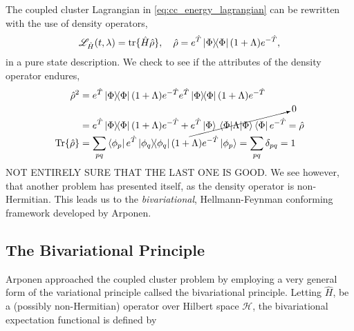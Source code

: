 The coupled cluster Lagrangian in \autoref{eq:cc_energy_lagrangian} can be rewritten 
with the use of density operators,
\begin{equation}
    \mathscr{L}_{\hat{H}}(t, \lambda) = \tr\{\hat{H}\hat{\rho}\}, \quad
    \hat{\rho} = e^{\hat{T}}\outerproduct{\Phi}(1 + \Lambda)e^{-\hat{T}},
\end{equation}
in a pure state description. We check to see if the attributes of the density operator 
endures,
\begin{align*}
    \hat{\rho}^2 &= 
        e^{\hat{T}}\outerproduct{\Phi}(1 + \Lambda)e^{-\hat{T}}
        e^{\hat{T}}\outerproduct{\Phi}(1 + \Lambda)e^{-\hat{T}} \\
        &= 
        e^{\hat{T}}\outerproduct{\Phi}(1 + \Lambda)e^{-\hat{T}}
        + \cancelto{0}{e^{\hat{T}}\ket{\Phi}
        \mel{\Phi}{\Lambda}{\Phi}
        \bra{\Phi}e^{-\hat{T}}} 
        = \hat{\rho} \\
    \Tr{\hat{\rho}} &= \sum_{pq} \bra{\phi_p}e^{\hat{T}}\outerproduct{\phi_q}(1 + \Lambda)e^{-\hat{T}} \ket{\phi_p}
    = \sum_{pq} \delta_{pq} = 1
\end{align*}
NOT ENTIRELY SURE THAT THE LAST ONE IS GOOD. We see however, that another problem has 
presented itself, as the density operator is non-Hermitian. This leads us to the 
\emph{bivariational},
Hellmann-Feynman conforming framework developed by 
Arponen\cite{arponen1983variational}.


\subsection{The Bivariational Principle}

Arponen approached the coupled cluster problem by employing a very general form 
of the variational principle callsed the bivariational principle. Letting $\hat{H}$,
be a (possibly non-Hermitian) operator over Hilbert space $\mathcal{H}$, the bivariational 
expectation functional is defined by 

